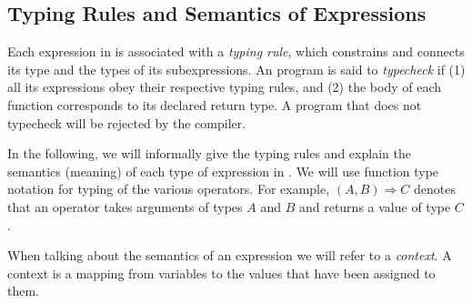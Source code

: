 \subsection{Typing Rules and Semantics of Expressions}
\label{sec:expr}

Each expression in \langname is associated with a \emph{typing rule},
which constrains and connects its type and the types of its subexpressions.
An \langname program is said to \emph{typecheck} if 
(1) all its expressions obey their respective typing rules, and
(2) the body of each function corresponds to its declared return type.
A program that does not typecheck will be rejected by the compiler.

\newcommand\Int{\gtns{Int(32)}\xspace}
\newcommand\Boolean{\gtns{Boolean}\xspace}
\newcommand\String{\gtns{String}\xspace}
\newcommand\Unit{\gtns{Unit}\xspace}
\newcommand{\typeI}[2]{\ensuremath{( #1 ) \RA #2 }}
\newcommand{\typeII}[3]{\ensuremath{( #1 , #2 ) \RA #3 }}
\newcommand{\typeIII}[4]{\ensuremath{( #1 , #2 , #3 ) \RA #4 }}

In the following, we will informally give the typing rules
and explain the semantics (meaning) of each type of expression in \langname.
We will use function type notation for typing of the various operators.
For example, $(A, B) \Rightarrow C$ denotes that an operator takes arguments of types $A$ and $B$
and returns a value of type $C$.

When talking about the semantics of an expression we will refer to a \emph{context}.
A context is a mapping from variables to the values that have been assigned to them.

